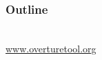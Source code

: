 %
%
\begin{frame}[c]
	\titlepage
\end{frame}

\begin{frame}[c]
  \frametitle{Outline}
  \tableofcontents %
\end{frame}










%



\begin{frame}[plain,c]

  \begin{center}
	\LARGE {}\\
	\vspace{1cm}
	\href{www.overturetool.org}{www.overturetool.org}
\end{center}
\end{frame}
